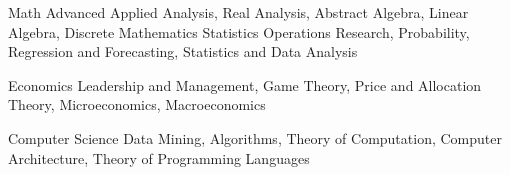 

\begin{cvskills}

\cvskill
  {Math} %
  {Advanced Applied Analysis, Real Analysis, Abstract Algebra, Linear Algebra, Discrete Mathematics} %
\cvskill
{Statistics} %
{Operations Research, Probability, Regression and Forecasting, Statistics and Data Analysis} %

\cvskill
  {Economics} %
  {Leadership and Management, Game Theory, Price and Allocation Theory, Microeconomics, Macroeconomics} %

  \cvskill
    {Computer Science} %
    {Data Mining, Algorithms, Theory of Computation, Computer Architecture, Theory of Programming Languages} %

\end{cvskills}
